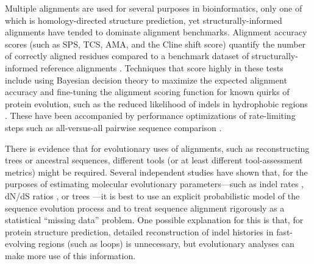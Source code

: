 \documentclass{bioinfo}
\begin{document}
Multiple alignments are used for several purposes in bioinformatics,
only one of which is homology-directed structure prediction,
yet structurally-informed alignments have tended to dominate alignment benchmarks.
Alignment accuracy scores (such as SPS, TCS, AMA, and the Cline shift score) quantify the number of correctly aligned residues
compared to a benchmark dataset of structurally-informed reference alignments \citep{ThompsonEtAl2005}.
Techniques that score highly in these tests include using Bayesian decision theory to maximize the expected
alignment accuracy \citep{NotredameEtAl2000,DoEtAl2005,SchwartzPachter2007,BradleyEtAl2009}
and fine-tuning the alignment scoring function for known quirks of
protein evolution, such as the reduced likelihood of indels in
hydrophobic regions \citep{KatohEtAl2005,Edgar2004b,LarkinEtAl2007}.
These have been accompanied by performance optimizations of 
rate-limiting steps such as all-versus-all pairwise sequence comparison \citep{BradleyEtAl2009,Edgar2004b}.

There is evidence that for evolutionary uses of alignments, such as reconstructing trees or ancestral sequences,
different tools (or at least different tool-assessment metrics) might be required.
Several independent studies have shown that, for the purposes of estimating
molecular evolutionary parameters---such as indel rates \citep{Westesson2012-zg},
dN/dS ratios \citep{Redelings2014},
or trees \citep{LoytynojaGoldman2008}---it is best to use an explicit probabilistic model of the sequence evolution process
and to treat sequence alignment rigorously as a statistical ``missing data'' problem.
One possible explanation for this is that, for protein structure prediction,
detailed reconstruction of indel histories in fast-evolving regions (such as loops) is unnecessary,
but evolutionary analyses can make more use of this information.
\end{document}
